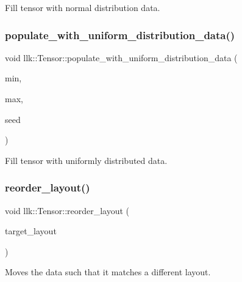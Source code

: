 Fill tensor with normal distribution data. 

\mbox{\label{classllk_1_1Tensor_a72f5408bc201d59f4967169dad10b369}} 
\subsubsection{\texorpdfstring{populate\+\_\+with\+\_\+uniform\+\_\+distribution\+\_\+data()}{populate\_with\_uniform\_distribution\_data()}}
{\footnotesize\ttfamily void llk\+::\+Tensor\+::populate\+\_\+with\+\_\+uniform\+\_\+distribution\+\_\+data (\begin{DoxyParamCaption}\item[{float}]{min,  }\item[{float}]{max,  }\item[{int}]{seed }\end{DoxyParamCaption})}



Fill tensor with uniformly distributed data. 

\mbox{\label{classllk_1_1Tensor_a17f312473d97c8786e6449236b4adf17}} 
\subsubsection{\texorpdfstring{reorder\+\_\+layout()}{reorder\_layout()}}
{\footnotesize\ttfamily void llk\+::\+Tensor\+::reorder\+\_\+layout (\begin{DoxyParamCaption}\item[{\hyperlink{namespacellk_a1cb439631a4f96e1431eea4d9b1f5cdb}{llk\+::\+Tensor\+Tile\+Layout}}]{target\+\_\+layout }\end{DoxyParamCaption})}



Moves the data such that it matches a different layout. 

\mbox{\label{classllk_1_1Tensor_ab11ae4fa56f2ca0ba4e8f2f1670e718f}} 
